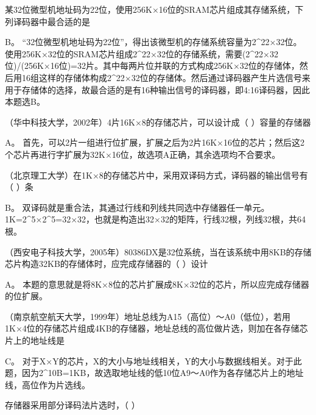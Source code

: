 \question 某32位微型机地址码为22位，使用256K×16位的SRAM芯片组成其存储系统，下列译码器中最合适的是
\par{}
\begin{solution}B。
``32位微型机地址码为22位''，得出该微型机的存储系统容量为2\^{}22×32位。
使用256K×32位的SRAM芯片组成2\^{}22×32位的存储系统，需要(2\^{}22×32位)/(256K×16位)=32片。其中每两片位并联的方式构成256K×32位的存储体，然后用16组这样的存储体构成2\^{}22×32位的存储体。然后通过译码器产生片选信号来用于存储体的选择，故最合适的是有16种输出信号的译码器，即4:16译码器，因此本题选B。
\end{solution}
\question （华中科技大学，2002年）4片16K×8的存储芯片，可以设计成（ ）容量的存储器
\par{}
\begin{solution}A。
首先，可以2片一组进行位扩展，扩展之后为2片16K×16位的芯片；然后这2个芯片再进行字扩展为32K×16位，故选项A正确，其余选项均不合要求。
\end{solution}
\question （北京理工大学）在1K×8的存储芯片中，采用双译码方式，译码器的输出信号有（
）条
\par{}
\begin{solution}B。
双译码就是重合法，其通过行线和列线共同选中存储器任一单元。1K=2\^{}5×2\^{}5=32×32，也就是构造出32×32的矩阵，行线32根，列线32根，共64根。
\end{solution}
\question （西安电子科技大学，2005年）80386DX是32位系统，当在该系统中用8KB的存储芯片构造32KB的存储体时，应完成存储器的（
）设计
\par{}
\begin{solution}A。
本题的意思就是将8K×8位的芯片扩展成8K×32位的芯片，所以应完成存储器的位扩展。
\end{solution}
\question （南京航空航天大学，1999年）地址总线为A15（高位）～A0（低位），若用1K×4位的存储芯片组成4KB的存储器，地址总线的高位做片选，则加在各存储芯片上的地址线是
\par{}
\begin{solution}C。
对于X×Y的芯片，X的大小与地址线相关，Y的大小与数据线相关。对于此题，因为2\^{}10B=1KB，故选取地址线的低10位A9～A0作为各存储芯片上的地址线，高位作为片选线。
\end{solution}
\question 存储器采用部分译码法片选时，（ ）
\par{}
